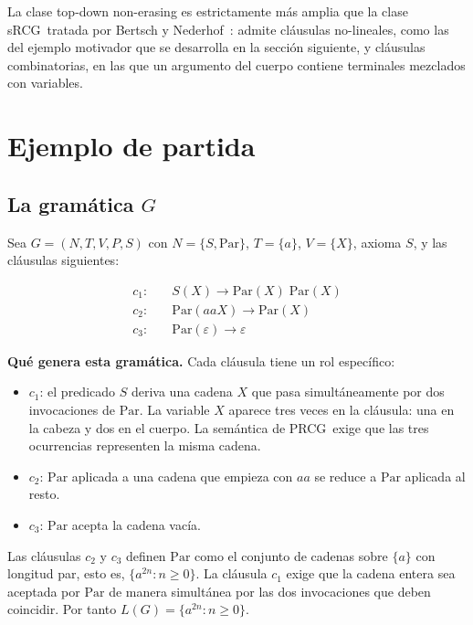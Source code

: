 \documentclass[11pt, letterpaper]{article}
\theoremstyle{definition}
\newcommand{\PRCG}{\mbox{PRCG}}
\newcommand{\sRCG}{\mbox{sRCG}}
\newcommand{\eps}{\varepsilon}
\newcommand{\Par}{\mathrm{Par}}
\begin{document}
La clase top-down non-erasing es estrictamente más amplia que la clase \sRCG\ tratada por Bertsch y Nederhof~\cite{REF}: admite cláusulas no-lineales, como las del ejemplo motivador que se desarrolla en la sección siguiente, y cláusulas combinatorias, en las que un argumento del cuerpo contiene terminales mezclados con variables.

\section{Ejemplo de partida}

\subsection{La gramática $G$}

Sea $G = (N, T, V, P, S)$ con $N = \{S, \Par\}$, $T = \{a\}$, $V = \{X\}$, axioma $S$, y las cláusulas siguientes:

\begin{tcolorbox}[colback=yellow!10, colframe=orange!60!black]
\begin{align*}
c_1: &\quad S(X)        \to \Par(X) \; \Par(X) \\
c_2: &\quad \Par(aaX)    \to \Par(X) \\
c_3: &\quad \Par(\eps)   \to \eps
\end{align*}
\end{tcolorbox}

\textbf{Qué genera esta gramática.} Cada cláusula tiene un rol específico:

\begin{itemize}
\item $c_1$: el predicado $S$ deriva una cadena $X$ que pasa simultáneamente por dos invocaciones de $\Par$. La variable $X$ aparece tres veces en la cláusula: una en la cabeza y dos en el cuerpo. La semántica de \PRCG\ exige que las tres ocurrencias representen la misma cadena.
\item $c_2$: $\Par$ aplicada a una cadena que empieza con $aa$ se reduce a $\Par$ aplicada al resto.
\item $c_3$: $\Par$ acepta la cadena vacía.
\end{itemize}

Las cláusulas $c_2$ y $c_3$ definen $\Par$ como el conjunto de cadenas sobre $\{a\}$ con longitud par, esto es, $\{a^{2n} : n \geq 0\}$. La cláusula $c_1$ exige que la cadena entera sea aceptada por $\Par$ de manera simultánea por las dos invocaciones que deben coincidir. Por tanto $L(G) = \{a^{2n} : n \geq 0\}$.
\end{document}

